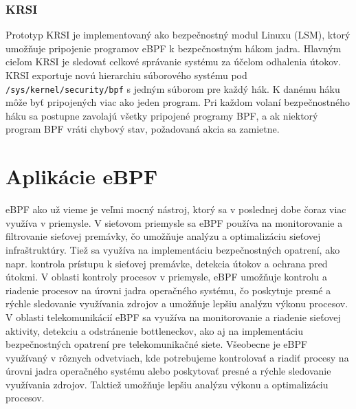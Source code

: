 \subsubsection{KRSI}
Prototyp KRSI je implementovaný ako bezpečnostný modul Linuxu (LSM), ktorý umožňuje pripojenie programov eBPF k bezpečnostným hákom jadra.
Hlavným cieľom KRSI je sledovať celkové správanie systému za účelom odhalenia útokov. 
KRSI exportuje novú hierarchiu súborového systému pod \texttt{/sys/kernel/security/bpf} s jedným súborom pre každý hák.
K danému háku môže byť pripojených viac ako jeden program.
Pri každom volaní bezpečnostného háku sa postupne zavolajú všetky pripojené programy BPF, a ak niektorý program BPF vráti chybový stav, 
požadovaná akcia sa zamietne.

\section{Aplikácie eBPF}
eBPF ako už vieme je veľmi mocný nástroj, ktorý sa v poslednej dobe čoraz viac využíva v priemysle. V sieťovom priemysle sa eBPF používa na monitorovanie 
a filtrovanie sieťovej premávky, čo umožňuje analýzu a optimalizáciu sieťovej infraštruktúry. Tiež sa využíva na implementáciu bezpečnostných opatrení, 
ako napr. kontrola prístupu k sieťovej premávke, detekcia útokov a ochrana pred útokmi. V oblasti kontroly procesov v priemysle, eBPF umožňuje kontrolu 
a riadenie procesov na úrovni jadra operačného systému, čo poskytuje presné a rýchle sledovanie využívania zdrojov a umožňuje lepšiu analýzu výkonu procesov. 
V oblasti telekomunikácií eBPF sa využíva na monitorovanie a riadenie sieťovej aktivity, detekciu a odstránenie bottleneckov, ako aj na implementáciu 
bezpečnostných opatrení pre telekomunikačné siete. Všeobecne je eBPF využívaný v rôznych odvetviach, kde potrebujeme kontrolovať a riadiť procesy 
na úrovni jadra operačného systému alebo poskytovať presné a rýchle sledovanie využívania zdrojov. Taktiež umožňuje lepšiu analýzu výkonu 
a optimalizáciu procesov.

